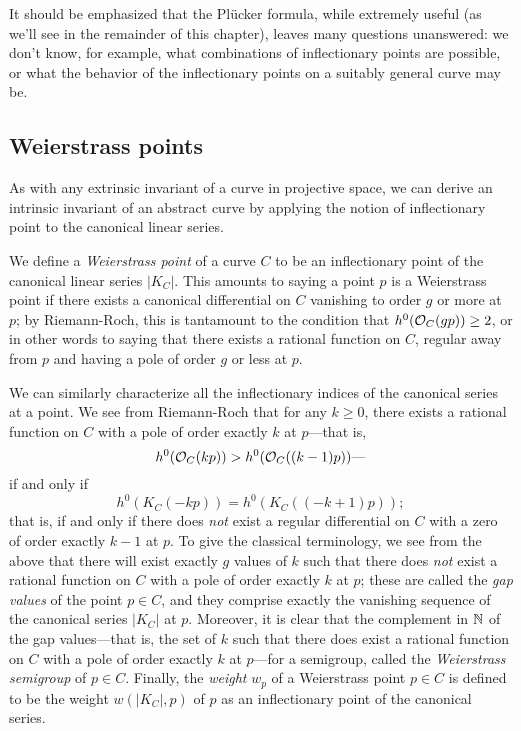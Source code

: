 It should be emphasized that the Pl\"ucker formula, while extremely useful (as we'll see in the remainder of this chapter), leaves many questions unanswered: we don't know, for example, what combinations of inflectionary points are possible, or what the behavior of the inflectionary points on a suitably general curve may be.

\subsection{Weierstrass points}

As with any extrinsic invariant of a curve in projective space, we can derive an intrinsic invariant of an abstract curve by applying the notion of inflectionary point to the canonical linear series. 

We define a \emph{Weierstrass point} of a curve $C$ to be an inflectionary point of the canonical linear series $|K_C|$. This amounts to saying a point $p$ is a Weierstrass point if there exists a canonical differential on $C$ vanishing to order $g$ or more at $p$; by Riemann-Roch, this is tantamount to the condition that $h^0(\cO_C(gp)) \geq 2$, or in other words to saying that there exists a rational function on $C$, regular away from $p$ and having a pole of order $g$ or less at $p$.

We can similarly characterize all the inflectionary indices of the canonical series at a point. We see from Riemann-Roch that for any $k \geq 0$, there exists a rational function on $C$ with a pole of order exactly $k$ at $p$---that is,
$$
h^0(\cO_C(kp)) > h^0(\cO_C((k-1)p))\text{---}
$$
if and only if 
$$
h^0(K_C(-kp)) = h^0(K_C((-k+1)p)); 
$$
that is, if and only if there does \emph{not} exist a regular differential on $C$ with a zero of order exactly $k-1$ at $p$. To give the classical terminology, we see from the above that there will exist exactly $g$ values of $k$ such that there does \emph{not} exist a rational function on $C$ with a pole of order exactly $k$ at $p$; these are called the \emph{gap values} of the point $p \in C$, and they comprise exactly the vanishing sequence of the canonical series $|K_C|$ at $p$. Moreover, it is clear that the complement in $\NN$ of the gap values---that is, the set of $k$ such that there does exist a rational function on $C$ with a pole of order exactly $k$ at $p$---for a semigroup, called the \emph{Weierstrass semigroup} of $p \in C$. Finally, the \emph{weight} $w_p$ of a Weierstrass point $p \in C$  is defined to be the weight $w(|K_C|,p)$ of $p$ as an inflectionary point of the canonical series.


